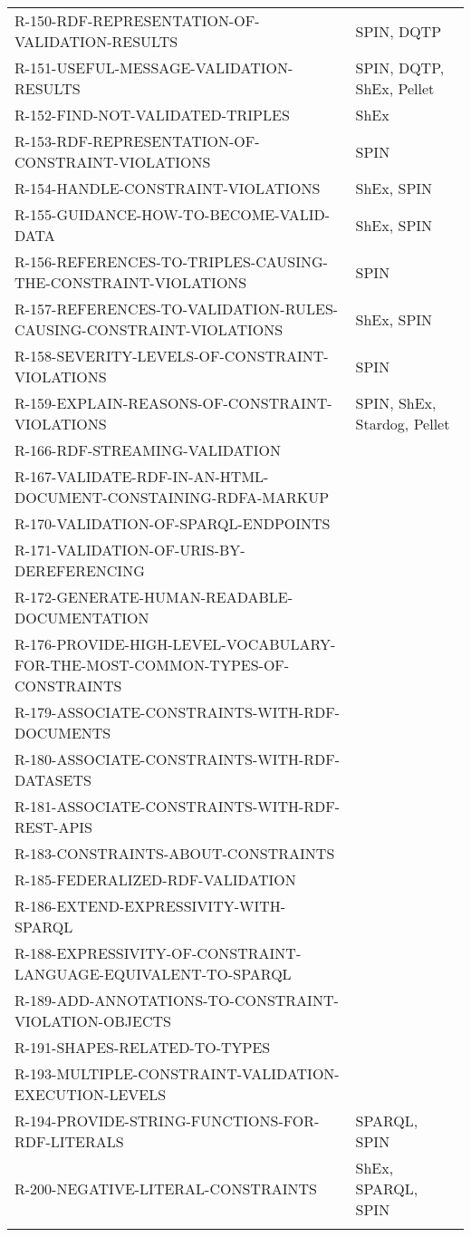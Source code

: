 \documentclass{llncs}
\newcommand{\hr}{\hline\noalign{\smallskip}} %
\begin{document}
\begin{table}
\begin{tabular}{ll}
R-150-RDF-REPRESENTATION-OF-VALIDATION-RESULTS & SPIN, DQTP \\
R-151-USEFUL-MESSAGE-VALIDATION-RESULTS & SPIN, DQTP, ShEx, Pellet \\
R-152-FIND-NOT-VALIDATED-TRIPLES & ShEx \\
R-153-RDF-REPRESENTATION-OF-CONSTRAINT-VIOLATIONS & SPIN \\
R-154-HANDLE-CONSTRAINT-VIOLATIONS & ShEx, SPIN \\
R-155-GUIDANCE-HOW-TO-BECOME-VALID-DATA & ShEx, SPIN \\
R-156-REFERENCES-TO-TRIPLES-CAUSING-THE-CONSTRAINT-VIOLATIONS & SPIN \\
R-157-REFERENCES-TO-VALIDATION-RULES-CAUSING-CONSTRAINT-VIOLATIONS & ShEx, SPIN \\
R-158-SEVERITY-LEVELS-OF-CONSTRAINT-VIOLATIONS & SPIN \\
R-159-EXPLAIN-REASONS-OF-CONSTRAINT-VIOLATIONS & SPIN, ShEx, Stardog, Pellet \\
R-166-RDF-STREAMING-VALIDATION & \\
R-167-VALIDATE-RDF-IN-AN-HTML-DOCUMENT-CONSTAINING-RDFA-MARKUP & \\
R-170-VALIDATION-OF-SPARQL-ENDPOINTS & \\
R-171-VALIDATION-OF-URIS-BY-DEREFERENCING & \\
R-172-GENERATE-HUMAN-READABLE-DOCUMENTATION & \\
R-176-PROVIDE-HIGH-LEVEL-VOCABULARY-FOR-THE-MOST-COMMON-TYPES-OF-CONSTRAINTS & \\
R-179-ASSOCIATE-CONSTRAINTS-WITH-RDF-DOCUMENTS & \\
R-180-ASSOCIATE-CONSTRAINTS-WITH-RDF-DATASETS & \\
R-181-ASSOCIATE-CONSTRAINTS-WITH-RDF-REST-APIS & \\
R-183-CONSTRAINTS-ABOUT-CONSTRAINTS & \\
R-185-FEDERALIZED-RDF-VALIDATION & \\
R-186-EXTEND-EXPRESSIVITY-WITH-SPARQL & \\
R-188-EXPRESSIVITY-OF-CONSTRAINT-LANGUAGE-EQUIVALENT-TO-SPARQL & \\
R-189-ADD-ANNOTATIONS-TO-CONSTRAINT-VIOLATION-OBJECTS & \\
R-191-SHAPES-RELATED-TO-TYPES & \\
R-193-MULTIPLE-CONSTRAINT-VALIDATION-EXECUTION-LEVELS & \\
R-194-PROVIDE-STRING-FUNCTIONS-FOR-RDF-LITERALS & SPARQL, SPIN \\
R-200-NEGATIVE-LITERAL-CONSTRAINTS & ShEx, SPARQL, SPIN \\
\hr
\end{tabular}
\end{table}
\end{document}
